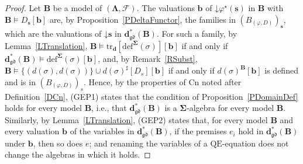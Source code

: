 \documentclass{amsart}
\newcommand{\vs}[1]{\mathbin{\downarrow}#1}
\theoremstyle{plain}
\theoremstyle{definition}
\begin{document}
\begin{proof}
Let $\mathbf{B}$ be a model of $(\mathbf{\Lambda},\mathcal{F})$. The valuations $\mathbf{b}$ of $\vs{\varphi^{\star}(\mathbf{s})}$ in $\mathbf{B}$ with $\mathbf{B}\models D_{\mathbf{s}}[\mathbf{b}]$ are, by Proposition~\ref{PDeltaFunctor}, the families in $(B_{(\varphi,D)})_{\mathbf{s}}$, which are the valuations of $\vs{\mathbf{s}}$ in $\mathbf{d}^{\ast}_{\mathfrak{gd}}(\mathbf{B})$. For such a family, by Lemma~\ref{LTranslation}, $\mathbf{B}\models\mathrm{tr}_{\mathbf{d}}[\mathrm{def}^{\mathbf{\Sigma}}(\sigma)][\mathbf{b}]$ if and only if $\mathbf{d}^{\ast}_{\mathfrak{gd}}(\mathbf{B})\models\mathrm{def}^{\mathbf{\Sigma}}(\sigma)[\mathbf{b}]$, and, by Remark~\ref{RSubst}, $\mathbf{B}\models\{(d(\sigma),d(\sigma))\}\cup d(\sigma)^{\sharp}[D_{s}][\mathbf{b}]$ if and only if $d(\sigma)^{\mathbf{B}}[\mathbf{b}]$ is defined and is in $(B_{(\varphi,D)})_{s}$. Hence, by the properties of $\mathrm{Cn}$ noted after Definition~\ref{DCn}, (GEP1) states that the condition of Proposition~\ref{PDomainDef} holds for every model $\mathbf{B}$, i.e., that $\mathbf{d}^{\ast}_{\mathfrak{gd}}(\mathbf{B})$ is a $\mathbf{\Sigma}$-algebra for every model $\mathbf{B}$. Similarly, by Lemma~\ref{LTranslation}, (GEP2) states that, for every model $\mathbf{B}$ and every valuation $\mathbf{b}$ of the variables in $\mathbf{d}^{\ast}_{\mathfrak{gd}}(\mathbf{B})$, if the premises $e_{i}$ hold in $\mathbf{d}^{\ast}_{\mathfrak{gd}}(\mathbf{B})$ under $\mathbf{b}$, then so does $e$; and renaming the variables of a $\mathrm{QE}$-equation does not change the algebras in which it holds.
\end{proof}
\end{document}
